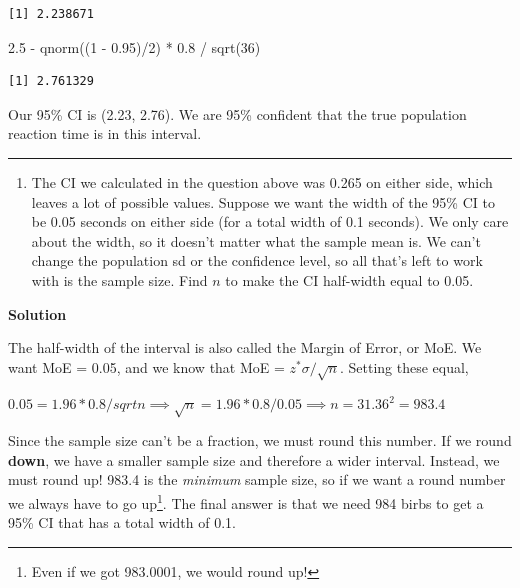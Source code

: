 \documentclass[
  letterpaper,
  DIV=11,
  numbers=noendperiod,
  oneside]{scrreprt}
\newenvironment{Shaded}{\begin{snugshade}}{\end{snugshade}}
\newcommand{\DecValTok}[1]{\textcolor[rgb]{0.68,0.00,0.00}{#1}}
\newcommand{\FloatTok}[1]{\textcolor[rgb]{0.68,0.00,0.00}{#1}}
\newcommand{\FunctionTok}[1]{\textcolor[rgb]{0.28,0.35,0.67}{#1}}
\newcommand{\NormalTok}[1]{\textcolor[rgb]{0.00,0.23,0.31}{#1}}
\newcommand{\SpecialCharTok}[1]{\textcolor[rgb]{0.37,0.37,0.37}{#1}}
\providecommand{\tightlist}{%
  \setlength{\itemsep}{0pt}\setlength{\parskip}{0pt}}\usepackage{longtable,booktabs,array}
\begin{document}
\begin{verbatim}
[1] 2.238671
\end{verbatim}

\begin{Shaded}
\begin{Highlighting}[]
\FloatTok{2.5} \SpecialCharTok{{-}} \FunctionTok{qnorm}\NormalTok{((}\DecValTok{1} \SpecialCharTok{{-}} \FloatTok{0.95}\NormalTok{)}\SpecialCharTok{/}\DecValTok{2}\NormalTok{) }\SpecialCharTok{*} \FloatTok{0.8} \SpecialCharTok{/} \FunctionTok{sqrt}\NormalTok{(}\DecValTok{36}\NormalTok{)}
\end{Highlighting}
\end{Shaded}

\begin{verbatim}
[1] 2.761329
\end{verbatim}

Our 95\% CI is (2.23, 2.76). We are 95\% confident that the true
population reaction time is in this interval.

\begin{center}\rule{0.5\linewidth}{0.5pt}\end{center}

\begin{enumerate}
\def\labelenumi{\arabic{enumi}.}
\setcounter{enumi}{9}
\tightlist
\item
  The CI we calculated in the question above was 0.265 on either side,
  which leaves a lot of possible values. Suppose we want the width of
  the 95\% CI to be 0.05 seconds on either side (for a total width of
  0.1 seconds). We only care about the width, so it doesn't matter what
  the sample mean is. We can't change the population sd or the
  confidence level, so all that's left to work with is the sample size.
  Find \(n\) to make the CI half-width equal to 0.05.
\end{enumerate}

\textbf{Solution}

The half-width of the interval is also called the Margin of Error, or
MoE. We want MoE = 0.05, and we know that MoE = \(z^*\sigma/\sqrt{n}\).
Setting these equal,

\(0.05 = 1.96 * 0.8 / sqrt{n} \implies \sqrt{n} = 1.96 * 0.8 / 0.05 \implies n = 31.36^2 = 983.4\)

Since the sample size can't be a fraction, we must round this number. If
we round \textbf{down}, we have a smaller sample size and therefore a
wider interval. Instead, we must round up! 983.4 is the \emph{minimum}
sample size, so if we want a round number we always have to go
up\footnote{Even if we got 983.0001, we would round up!}. The final
answer is that we need 984 birbs to get a 95\% CI that has a total width
of 0.1.
\end{document}
